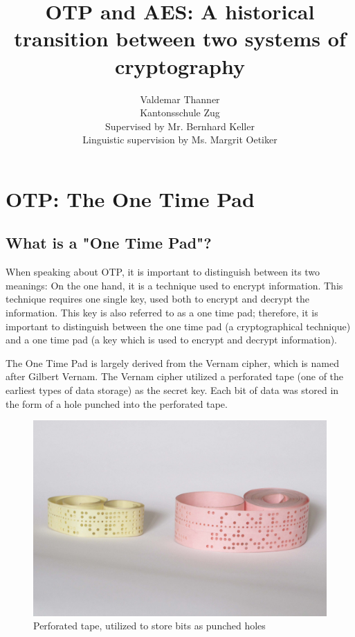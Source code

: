\documentclass[12pt]{report}
\begin{document}
\title{OTP and AES: A historical transition between two systems of cryptography}
\author{Valdemar Thanner\\Kantonsschule Zug\\Supervised by Mr. Bernhard Keller\\Linguistic supervision by Ms. Margrit Oetiker}
\maketitle

\tableofcontents

\chapter{OTP: The One Time Pad}

\section{What is a "One Time Pad"?}
When speaking about OTP, it is important to distinguish between its two meanings: On the one hand, it is a technique used to encrypt information. This technique requires one single key, used both to encrypt and decrypt the information. This key is also referred to as a one time pad; therefore, it is important to distinguish between the one time pad (a cryptographical technique) and a one time pad (a key which is used to encrypt and decrypt information).

The One Time Pad is largely derived from the Vernam cipher, which is named after Gilbert Vernam. The Vernam cipher utilized a perforated tape (one of the earliest types of data storage) as the secret key\cite{VernamPatent}. Each bit of data was stored in the form of a hole punched into the perforated tape.

\begin{figure}[H]
\centering
\includegraphics[scale=0.5]{PerforatedTape}
\caption{Perforated tape, utilized to store bits as punched holes}
\end{figure}
\end{document}
